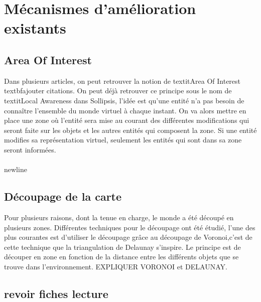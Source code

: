 \section{Mécanismes d'amélioration existants}
	\subsection{Area Of Interest}
	Dans plusieurs articles, on peut retrouver la notion de textit{Area Of Interest} textbf{ajouter citations}. On peut déjà retrouver ce principe sous le nom de textit{Local Awareness} dans Sollipsis, l'idée est qu'une entité n'a pas besoin de connaître l'ensemble du monde virtuel à chaque instant. On va alors mettre en place une zone où l'entité sera mise au courant des différentes modifications qui seront faite sur les objets et les autres entités qui composent la zone. Si une entité modifies sa représentation virtuel, seulement les entités qui sont dans sa zone seront informées.\\
	\\newline
	\subsection{Découpage de la carte}
	Pour plusieurs raisons, dont la tenue en charge, le monde a été découpé en plusieurs zones. Différentes techniques pour le découpage ont été étudié, l'une des plus courantes est d'utiliser le découpage grâce au découpage de Voronoi,c'est de cette technique que la triangulation de Delaunay s'inspire. Le principe est de découper en zone en fonction de la distance entre les différents objets que se trouve dans l'environnement. EXPLIQUER VORONOI et DELAUNAY.\\


	\subsection{revoir fiches lecture} 
